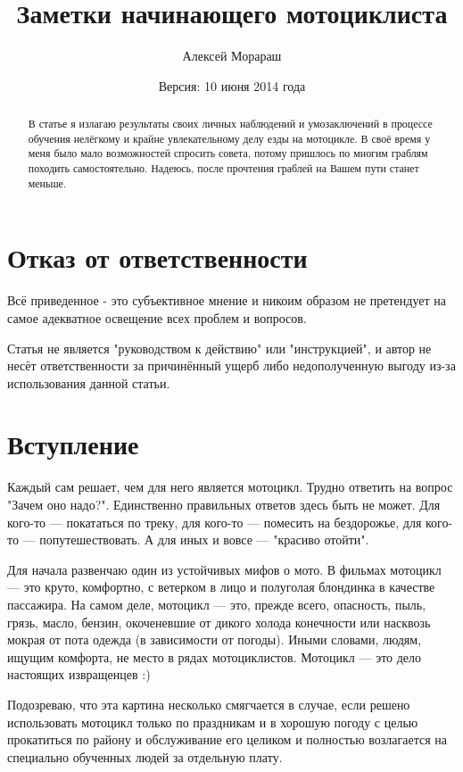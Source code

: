 \documentclass[12pt,a4paper]{article}
\title{Заметки начинающего мотоциклиста}
\author{Алексей Морараш}
\date{Версия: 10 июня 2014 года}
\begin{document}
\maketitle

\renewcommand{\contentsname}{Содержание}

\tableofcontents

\clearpage

\begin{abstract}
В статье я излагаю результаты своих личных наблюдений и умозаключений
в процессе обучения нелёгкому и крайне увлекательному делу езды на
мотоцикле. В своё время у меня было мало возможностей спросить совета,
потому пришлось по многим граблям походить самостоятельно. Надеюсь,
после прочтения граблей на Вашем пути станет меньше.
\end{abstract}

\section{Отказ от ответственности}

Всё приведенное - это субъективное мнение и никоим образом не
претендует на самое адекватное освещение всех проблем и вопросов.

Статья не является "руководством к действию" или "инструкцией",
и автор не несёт ответственности за причинённый ущерб либо
недополученную выгоду из-за использования данной статьи.

\section{Вступление}

Каждый сам решает, чем для него является мотоцикл. Трудно ответить
на вопрос "Зачем оно надо?". Единственно правильных ответов
здесь быть не может. Для кого-то --- покататься по треку, для кого-то ---
помесить на бездорожье, для кого-то --- попутешествовать. А для иных и
вовсе --- "красиво отойти".

Для начала развенчаю один из устойчивых мифов о мото. В фильмах
мотоцикл --- это круто, комфортно, с ветерком в лицо и полуголая
блондинка в качестве пассажира. На самом деле, мотоцикл --- это,
прежде всего, опасность, пыль, грязь, масло, бензин, окоченевшие
от дикого холода конечности или насквозь мокрая от пота одежда
(в зависимости от погоды). Иными словами, людям, ищущим комфорта,
не место в рядах мотоциклистов. Мотоцикл --- это дело настоящих
извращенцев :)

Подозреваю, что эта картина несколько смягчается в случае, если
решено использовать мотоцикл только по праздникам и в хорошую погоду
с целью прокатиться по району и обслуживание его целиком и полностью
возлагается на специально обученных людей за отдельную плату.
\end{document}
